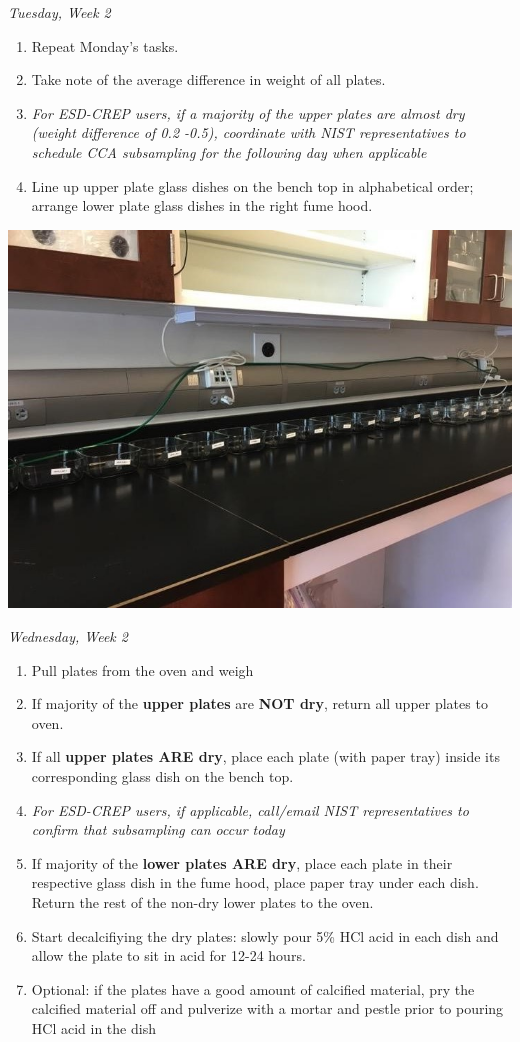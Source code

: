 \documentclass[
]{book}
\providecommand{\tightlist}{%
  \setlength{\itemsep}{0pt}\setlength{\parskip}{0pt}}
\begin{document}
\emph{Tuesday, Week 2}

\begin{enumerate}
\def\labelenumi{\arabic{enumi}.}
\tightlist
\item
  Repeat Monday's tasks.
\item
  Take note of the average difference in weight of all plates.
\item
  \emph{For ESD-CREP users, if a majority of the upper plates are almost dry (weight difference of 0.2 -0.5), coordinate with NIST representatives to schedule CCA subsampling for the following day when applicable}
\item
  Line up upper plate glass dishes on the bench top in alphabetical order; arrange lower plate glass dishes in the right fume hood.
\end{enumerate}

\includegraphics{images/DailyTasks8.jpg}

\emph{Wednesday, Week 2}

\begin{enumerate}
\def\labelenumi{\arabic{enumi}.}
\tightlist
\item
  Pull plates from the oven and weigh
\item
  If majority of the \textbf{upper plates} are \textbf{NOT dry}, return all upper plates to oven.
\item
  If all \textbf{upper plates ARE dry}, place each plate (with paper tray) inside its corresponding glass dish on the bench top.
\item
  \emph{For ESD-CREP users, if applicable, call/email NIST representatives to confirm that subsampling can occur today}
\item
  If majority of the \textbf{lower plates ARE dry}, place each plate in their respective glass dish in the fume hood, place paper tray under each dish. Return the rest of the non-dry lower plates to the oven.
\item
  Start decalcifiying the dry plates: slowly pour 5\% HCl acid in each dish and allow the plate to sit in acid for 12-24 hours.
\item
  Optional: if the plates have a good amount of calcified material, pry the calcified material off and pulverize with a mortar and pestle prior to pouring HCl acid in the dish
\end{enumerate}
\end{document}
